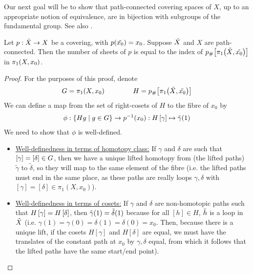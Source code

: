 Our next goal will be to show that path-connected covering spaces of $X$, up to an appropriate notion of equivalence, are in bijection with subgroups of the fundamental group. See also \cite[Ch 5, \S 8 « Correspondance galoisienne »]{EPFLTopologie}.


\begin{boxtheorem}
    Let $p : \Tilde{X} \to X$ be a covering, with $p\!\left( \Tilde{x_0} \right) = x_0$. Suppose $\Tilde{X}$ and $X$ are path-connected. Then the number of sheets of $p$ is equal to the index of $p_{\#}\!\left[ \pi_1\!\left( \Tilde{X}, \Tilde{x_0} \right) \right]$ in $\pi_1\!\left( X, x_0 \right)$.
\end{boxtheorem}
\begin{proof}
    For the purposes of this proof, denote
    \begin{align*}
        G = \pi_1\!\left( X, x_0 \right)
        \qquad \qquad
        H = p_{\#}\!\left[ \pi_1\!\left( \Tilde{X}, \Tilde{x_0} \right) \right]
    \end{align*}
    We can define a map from the set of right-cosets of $H$ to the fibre of $x_0$ by
    \begin{align*}
        \phi : \left\{ Hg \; \middle\vert \; g \in G \right\} \to p^{-1}\!\left( x_0 \right) : H\left[ \gamma \right] \mapsto \Tilde{\gamma}\!\left( 1 \right)
    \end{align*}
    We need to show that $\phi$ is well-defined.
    \begin{itemize}
        \item \underline{Well-definedness in terms of homotopy class:} If $\gamma$ and $\delta$ are such that $\left[ \gamma \right] = \left[ \delta \right] \in G$, then we have a unique lifted homotopy from (the lifted paths) $\tilde{\gamma}$ to $\tilde{\delta}$, so they will map to the same element of the fibre (i.e. the lifted paths must end in the same place, as these paths are really loops $\gamma, \delta$ with $[\gamma]= [\delta]\in \pi_1(X,x_0)$). \sorry %
        
        \item \underline{Well-definedness in terms of cosets:} If $\gamma$ and $\delta$ are non-homotopic paths such that $H\left[ \gamma \right] = H \left[ \delta \right]$, then $\Tilde{\gamma}(1) = \Tilde{\delta}(1)$ because for all $[h] \in H$, $\Tilde{h}$ is a loop in $\Tilde{X}$ (i.e. $\gamma(1)=\gamma(0)=\delta(1)=\delta(0)=x_0$. Then, because there is a unique lift, if the cosets $H[\gamma]$ and $H[\delta]$ are equal, we must have the translates of the constant path at $x_0$ by $\gamma, \delta$ equal, from which it follows that the lifted paths have the same start/end point). \sorry %
    \end{itemize}


\end{proof}
